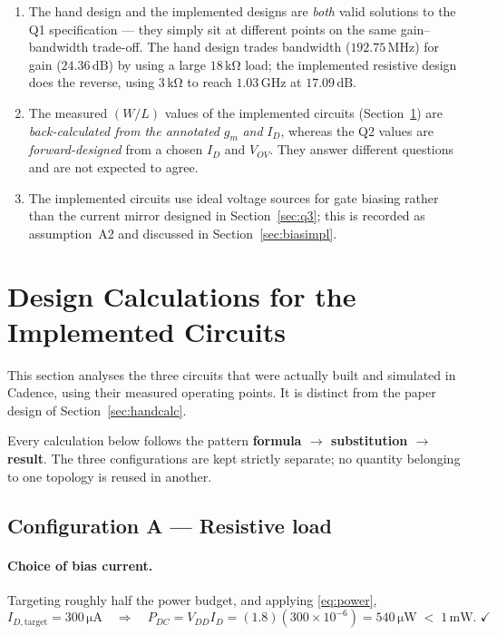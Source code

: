 \documentclass[12pt,a4paper]{article}
\newcommand{\U}[1]{\,\mathrm{#1}}
\begin{document}
\begin{enumerate}[leftmargin=2.0em,itemsep=2pt]
\item The hand design and the implemented designs are \emph{both} valid
      solutions to the Q1 specification --- they simply sit at different points
      on the same gain--bandwidth trade-off. The hand design trades bandwidth
      ($192.75\U{MHz}$) for gain ($24.36\U{dB}$) by using a large
      $18\U{k\Omega}$ load; the implemented resistive design does the reverse,
      using $3\U{k\Omega}$ to reach $1.03\U{GHz}$ at $17.09\U{dB}$.
\item The measured $(W/L)$ values of the implemented circuits
      (Section~\ref{sec:calc}) are \emph{back-calculated from the annotated}
      $g_m$ \emph{and} $I_D$, whereas the Q2 values are \emph{forward-designed}
      from a chosen $I_D$ and $V_{OV}$. They answer different questions and are
      not expected to agree.
\item The implemented circuits use ideal voltage sources for gate biasing
      rather than the current mirror designed in Section~\ref{sec:q3}; this is
      recorded as assumption~A2 and discussed in Section~\ref{sec:biasimpl}.
\end{enumerate}

\section{Design Calculations for the Implemented Circuits}\label{sec:calc}
This section analyses the three circuits that were actually built and simulated
in Cadence, using their measured operating points. It is distinct from the
paper design of Section~\ref{sec:handcalc}.

Every calculation below follows the pattern
\textbf{formula $\rightarrow$ substitution $\rightarrow$ result}.
The three configurations are kept strictly separate; no quantity belonging to
one topology is reused in another.

\subsection{Configuration A --- Resistive load}\label{sec:calcres}
\paragraph{Choice of bias current.}
Targeting roughly half the power budget, and applying \eqref{eq:power},
\[
I_{D,\text{target}} = 300\U{\mu A}
\quad\Rightarrow\quad
P_{DC} = V_{DD}I_D = (1.8)(300\times10^{-6}) = 540\U{\mu W} \;<\; 1\U{mW}.\;\checkmark
\]
\end{document}
